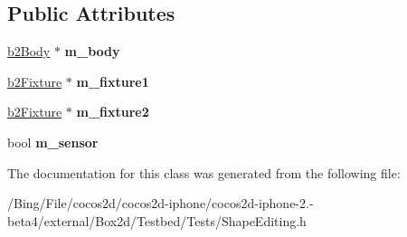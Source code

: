 \subsection*{Public Attributes}
\begin{DoxyCompactItemize}
\item 
\hypertarget{class_shape_editing_a91b4f82b3155ef8674b1016a96846faf}{\hyperlink{classb2_body}{b2\-Body} $\ast$ {\bfseries m\-\_\-body}}\label{class_shape_editing_a91b4f82b3155ef8674b1016a96846faf}

\item 
\hypertarget{class_shape_editing_a60272e49717c45fec2eee4c9ea978adc}{\hyperlink{classb2_fixture}{b2\-Fixture} $\ast$ {\bfseries m\-\_\-fixture1}}\label{class_shape_editing_a60272e49717c45fec2eee4c9ea978adc}

\item 
\hypertarget{class_shape_editing_a9e66aa976416e5ca21de3b81c467de36}{\hyperlink{classb2_fixture}{b2\-Fixture} $\ast$ {\bfseries m\-\_\-fixture2}}\label{class_shape_editing_a9e66aa976416e5ca21de3b81c467de36}

\item 
\hypertarget{class_shape_editing_a5de917c9a163498efca0ba2216d48fc6}{bool {\bfseries m\-\_\-sensor}}\label{class_shape_editing_a5de917c9a163498efca0ba2216d48fc6}

\end{DoxyCompactItemize}


The documentation for this class was generated from the following file\-:\begin{DoxyCompactItemize}
\item 
/\-Bing/\-File/cocos2d/cocos2d-\/iphone/cocos2d-\/iphone-\/2.-\/beta4/external/\-Box2d/\-Testbed/\-Tests/Shape\-Editing.\-h\end{DoxyCompactItemize}
